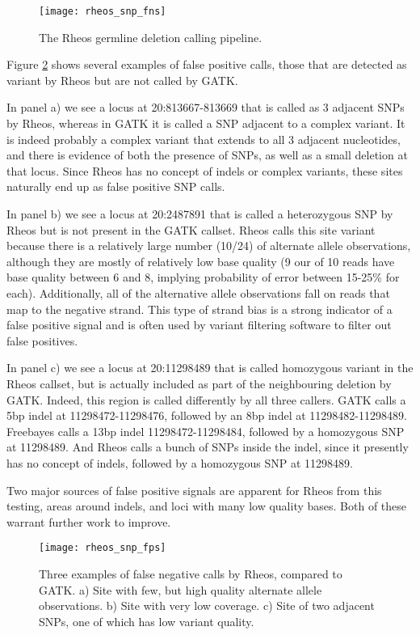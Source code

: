 \begin{figure}[h!]
    \texttt{[image: rheos\_snp\_fns]}
    \centering
    \caption {The Rheos germline deletion calling pipeline.}
    \label{fig:rheos_snp_fns}
\end{figure}

Figure \ref{fig:rheos_snp_fps} shows several examples of false positive calls, those that are detected as variant by Rheos but are not called by GATK. 

In panel a) we see a locus at 20:813667-813669 that is called as 3 adjacent SNPs by Rheos, whereas in GATK it is called a SNP adjacent to a complex variant. It is indeed probably a complex variant that extends to all 3 adjacent nucleotides, and there is evidence of both the presence of SNPs, as well as a small deletion at that locus. Since Rheos has no concept of indels or complex variants, these sites naturally end up as false positive SNP calls. 

In panel b) we see a locus at 20:2487891 that is called a heterozygous SNP by Rheos but is not present in the GATK callset. Rheos calls this site variant because there is a relatively large number (10/24) of alternate allele observations, although they are mostly of relatively low base quality (9 our of 10 reads have base quality between 6 and 8, implying probability of error between 15-25\% for each). Additionally, all of the alternative allele observations fall on reads that map to the negative strand. This type of strand bias is a strong indicator of a false positive signal and is often used by variant filtering software to filter out false positives.

In panel c) we see a locus at 20:11298489 that is called homozygous variant in the Rheos callset, but is actually included as part of the neighbouring deletion by GATK. Indeed, this region is called differently by all three callers. GATK calls a 5bp indel at 11298472-11298476, followed by an 8bp indel at 11298482-11298489. Freebayes calls a 13bp indel 11298472-11298484, followed by a homozygous SNP at 11298489. And Rheos calls a bunch of SNPs inside the indel, since it presently has no concept of indels, followed by a homozygous SNP at 11298489. 

Two major sources of false positive signals are apparent for Rheos from this testing, areas around indels, and loci with many low quality bases. Both of these warrant further work to improve. 

\begin{figure}[h!]
    \texttt{[image: rheos\_snp\_fps]}
    \centering
    \caption {Three examples of false negative calls by Rheos, compared to GATK. a) Site with few, but high quality alternate allele observations. b) Site with very low coverage. c) Site of two adjacent SNPs, one of which has low variant quality.}
    \label{fig:rheos_snp_fps}
\end{figure}

